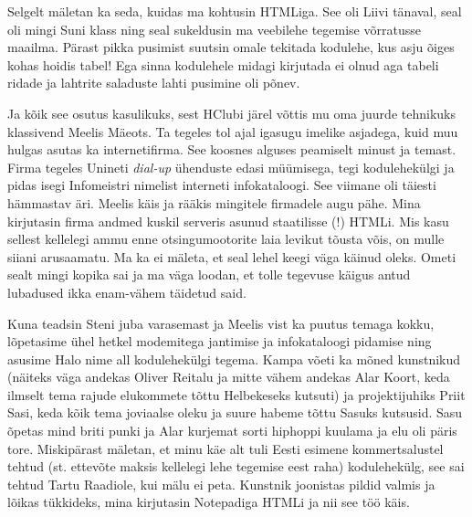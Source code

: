 Selgelt mäletan ka seda, kuidas ma kohtusin HTMLiga. See oli Liivi 
tänaval, seal oli mingi Suni 
klass ning seal sukeldusin ma veebilehe tegemise 
võrratusse maailma. Pärast pikka pusimist suutsin omale tekitada kodulehe, kus 
asju õiges kohas hoidis tabel! Ega sinna kodulehele midagi kirjutada ei olnud 
aga tabeli ridade ja lahtrite saladuste lahti pusimine oli põnev.

Ja kõik see osutus kasulikuks, sest HClubi järel võttis mu oma juurde tehnikuks 
klassivend Meelis Mäeots. Ta tegeles tol ajal 
igasugu imelike asjadega, kuid muu hulgas asutas ka internetifirma. See koosnes 
alguses peamiselt minust ja temast. Firma tegeles Unineti 
\emph{dial-up} ühenduste edasi müümisega, tegi kodulehekülgi ja pidas isegi 
Infomeistri nimelist interneti infokataloogi. See viimane oli täiesti hämmastav 
äri. Meelis käis ja rääkis mingitele firmadele augu pähe. Mina kirjutasin firma 
andmed kuskil serveris asunud staatilisse (!) HTMLi. Mis kasu sellest kellelegi 
ammu enne otsingumootorite laia levikut tõusta võis, on mulle siiani 
arusaamatu. Ma ka ei mäleta, et seal lehel keegi väga käinud oleks. Ometi sealt 
mingi kopika sai ja ma väga loodan, et tolle tegevuse käigus antud lubadused 
ikka enam-vähem täidetud said. 

Kuna teadsin Steni juba varasemast ja Meelis vist ka puutus temaga kokku, 
lõpetasime ühel hetkel modemitega jantimise ja infokataloogi pidamise ning 
asusime Halo nime all kodulehekülgi tegema. Kampa 
võeti ka mõned kunstnikud (näiteks väga andekas Oliver 
Reitalu ja mitte vähem andekas Alar 
Koort, keda ilmselt tema rajude elukommete tõttu 
Helbekeseks kutsuti) ja projektijuhiks Priit Sasi, keda 
kõik tema joviaalse oleku ja suure habeme tõttu Sasuks kutsusid. Sasu õpetas 
mind briti punki ja Alar kurjemat sorti hiphoppi kuulama ja elu oli päris tore. 
Miskipärast mäletan, et minu käe alt tuli Eesti esimene kommertsalustel tehtud 
(st. ettevõte maksis kellelegi lehe tegemise eest raha) kodulehekülg, see sai 
tehtud Tartu Raadiole, kui mälu ei peta. Kunstnik joonistas 
pildid valmis ja lõikas tükkideks, mina kirjutasin Notepadiga HTMLi ja nii see 
töö käis. 

